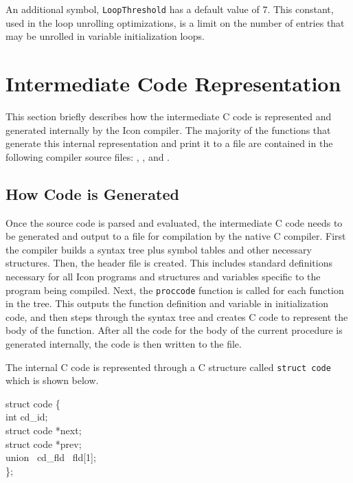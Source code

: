 An additional symbol, \texttt{LoopThreshold} has a default value of
7. This constant, used in the loop unrolling optimizations, is a limit
on the number of entries that may be unrolled in variable
initialization loops.


\section{Intermediate Code Representation}

This section briefly describes how the intermediate C code is
represented and generated internally by the Icon compiler.  The
majority of the functions that generate this internal representation
and print it to a file are contained in the following compiler source
files: , , and .

\subsection{How Code is Generated}

Once the source code is parsed and evaluated, the intermediate C code
needs to be generated and output to a file for compilation by the
native C compiler. First the compiler builds a syntax tree plus symbol
tables and other necessary structures. Then, the header file is
created. This includes standard definitions necessary for all Icon
programs and structures and variables specific to the program being
compiled. Next, the \texttt{proccode} function is called for each
function in the tree. This outputs the function definition and
variable in initialization code, and then steps through the syntax
tree and creates C code to represent the body of the function. After
all the code for the body of the current procedure is generated
internally, the code is then written to the file.

The internal C code is represented through a C structure called
\texttt{struct code} which is shown below.

\goodbreak
\begin{iconcode}
struct code \{\\
\>int cd\_id;\\
\>struct code *next;\\
\>struct code *prev;\\
\>union \ cd\_fld \ fld[1];\\
\};\\
\end{iconcode}


